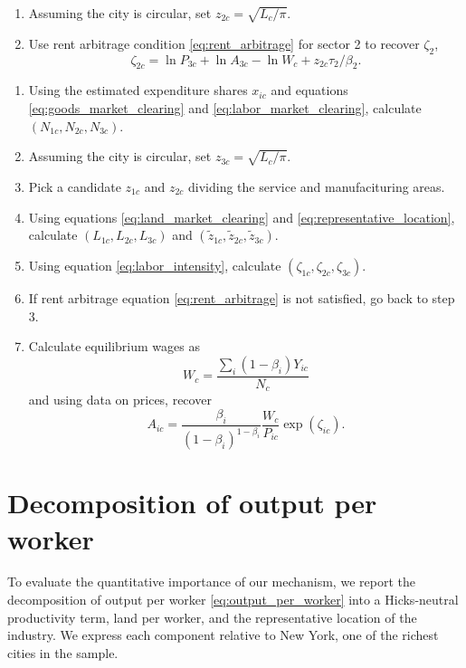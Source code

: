 \documentclass[12pt]{article}
\begin{document}
\begin{enumerate}
	\item Assuming the city is circular, set $z_{2c}=\sqrt{L_c/\pi}$.
	\item Use rent arbitrage condition \eqref{eq:rent_arbitrage} for sector 2 to recover $\zeta_2$, 
	\[
	\zeta_{2c} = \ln P_{3c} + \ln A_{3c} - \ln W_c + z_{2c}\tau_2/\beta_2.
	\]
\end{enumerate}
\begin{enumerate}
	\item Using the estimated expenditure shares $x_{ic}$ and equations \eqref{eq:goods_market_clearing} and \eqref{eq:labor_market_clearing}, calculate $(N_{1c},N_{2c},N_{3c})$.
	\item Assuming the city is circular, set $z_{3c}=\sqrt{L_c/\pi}$.
	\item Pick a candidate $z_{1c}$ and $z_{2c}$ dividing the service and manufacituring areas.
	\item Using equations \eqref{eq:land_market_clearing} and \eqref{eq:representative_location}, calculate $(L_{1c}, L_{2c}, L_{3c})$ and $(\tilde z_{1c}, \tilde z_{2c}, \tilde z_{3c})$.
	\item Using equation \eqref{eq:labor_intensity}, calculate $(\zeta_{1c}, \zeta_{2c}, \zeta_{3c})$.
	\item If rent arbitrage equation \eqref{eq:rent_arbitrage} is not satisfied, go back to step 3.
	\item Calculate equilibrium wages as
	\[
		W_c = \frac
			{\sum_i (1-\beta_i)Y_{ic}}
			{N_c}
	\]
	and using data on prices, recover
	\[
		A_{ic} =
			 \frac {\beta_i}{(1-\beta_i)^{1-\beta_i}}
			 \frac {W_c}{P_{ic}}
			 \exp(\zeta_{ic}).
	\]
\end{enumerate}

\section{Decomposition of output per worker}
To evaluate the quantitative importance of our mechanism, we report the decomposition of output per worker \eqref{eq:output_per_worker} into a Hicks-neutral productivity term, land per worker, and the representative location of the industry. We express each component relative to New York, one of the richest cities in the sample.
\end{document}
